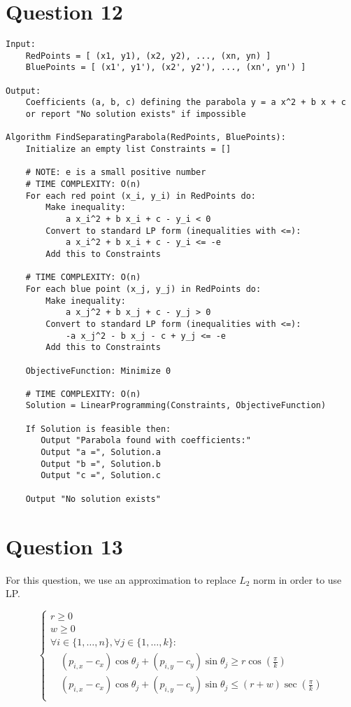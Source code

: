 \documentclass{article}
\begin{document}
\section*{Question 12}
\begin{verbatim}
Input: 
    RedPoints = [ (x1, y1), (x2, y2), ..., (xn, yn) ]
    BluePoints = [ (x1', y1'), (x2', y2'), ..., (xn', yn') ]

Output:
    Coefficients (a, b, c) defining the parabola y = a x^2 + b x + c
    or report "No solution exists" if impossible

Algorithm FindSeparatingParabola(RedPoints, BluePoints): 
    Initialize an empty list Constraints = []

    # NOTE: e is a small positive number
    # TIME COMPLEXITY: O(n)
    For each red point (x_i, y_i) in RedPoints do:
        Make inequality:
            a x_i^2 + b x_i + c - y_i < 0
        Convert to standard LP form (inequalities with <=):
            a x_i^2 + b x_i + c - y_i <= -e
        Add this to Constraints

    # TIME COMPLEXITY: O(n)
    For each blue point (x_j, y_j) in RedPoints do:
        Make inequality:
            a x_j^2 + b x_j + c - y_j > 0
        Convert to standard LP form (inequalities with <=):
            -a x_j^2 - b x_j - c + y_j <= -e
        Add this to Constraints

    ObjectiveFunction: Minimize 0

    # TIME COMPLEXITY: O(n)
    Solution = LinearProgramming(Constraints, ObjectiveFunction)

    If Solution is feasible then:
       Output "Parabola found with coefficients:"
       Output "a =", Solution.a
       Output "b =", Solution.b
       Output "c =", Solution.c

    Output "No solution exists"

\end{verbatim}

\newpage

\section*{Question 13}
For this question, we use an approximation to replace $L_2$ norm in order to use LP.

\[
    \begin{cases}
        r \geq 0 \\
        w \geq 0 \\
        \forall i \in \{1, \ldots, n\}, \forall j \in \{1, \ldots, k\}: \\
        \quad (p_{i,x} - c_x) \cos \theta_j + (p_{i,y} - c_y) \sin \theta_j \geq r \cos\left(\frac{\pi}{k}\right) \\
        \quad (p_{i,x} - c_x) \cos \theta_j + (p_{i,y} - c_y) \sin \theta_j \leq (r + w) \sec\left(\frac{\pi}{k}\right) \\
    \end{cases}
\]
\end{document}
